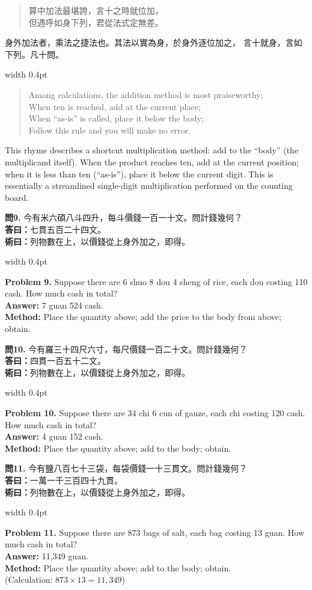\documentclass[10pt,a4paper]{article}
\newlength{\cnwidth}
\newlength{\enwidth}
\newcommand{\bilingual}[2]{%
  \noindent%
  \begin{minipage}[t]{\cnwidth}%
    #1%
  \end{minipage}%
  \hfill\vrule width 0.4pt\hfill%
  \begin{minipage}[t]{\enwidth}%
    #2%
  \end{minipage}%
  \par\smallskip%
}
\newenvironment{rhymecn}{%
  \begin{quote}\itshape\color{verselinecolor}
}{\end{quote}}
\begin{document}
\bilingual{%
  \begin{rhymecn}
  算中加法最堪誇，言十之時就位加，\\
  但遇呼如身下列，君從法式定無差。
  \end{rhymecn}
  身外加法者，乘法之捷法也。其法以實為身，於身外逐位加之，
  言十就身，言如下列。凡十問。
}{%
  \begin{rhymecn}
  Among calculations, the addition method is most praiseworthy;\\
  When ten is reached, add at the current place;\\
  When ``as-is'' is called, place it below the body;\\
  Follow this rule and you will make no error.
  \end{rhymecn}
  This rhyme describes a shortcut multiplication method: add to the
  ``body'' (the multiplicand itself). When the product reaches ten, add at the
  current position; when it is less than ten (``as-is''), place it below the
  current digit. This is essentially a streamlined single-digit multiplication
  performed on the counting board.
}

\bilingual{%
  \textbf{問9.}
  今有米六碩八斗四升，每斗價錢一百一十文。問計錢幾何？\\
  \textbf{答曰：}七貫五百二十四文。\\
  \textbf{術曰：}列物數在上，以價錢從上身外加之，即得。
}{%
  \textbf{Problem 9.}
  Suppose there are 6 shuo 8 dou 4 sheng of rice, each dou costing 110 cash.
  How much cash in total?\\
  \textbf{Answer:} 7 guan 524 cash.\\
  \textbf{Method:} Place the quantity above; add the price to the body from above; obtain.
}

\bilingual{%
  \textbf{問10.}
  今有羅三十四尺六寸，每尺價錢一百二十文。問計錢幾何？\\
  \textbf{答曰：}四貫一百五十二文。\\
  \textbf{術曰：}列物數在上，以價錢從上身外加之，即得。
}{%
  \textbf{Problem 10.}
  Suppose there are 34 chi 6 cun of gauze, each chi costing 120 cash.
  How much cash in total?\\
  \textbf{Answer:} 4 guan 152 cash.\\
  \textbf{Method:} Place the quantity above; add to the body; obtain.
}

\bilingual{%
  \textbf{問11.}
  今有鹽八百七十三袋，每袋價錢一十三貫文。問計錢幾何？\\
  \textbf{答曰：}一萬一千三百四十九貫。\\
  \textbf{術曰：}列物數在上，以價錢從上身外加之，即得。
}{%
  \textbf{Problem 11.}
  Suppose there are 873 bags of salt, each bag costing 13 guan.
  How much cash in total?\\
  \textbf{Answer:} 11,349 guan.\\
  \textbf{Method:} Place the quantity above; add to the body; obtain.\\
  (Calculation: $873 \times 13 = 11{,}349$)
}
\end{document}
